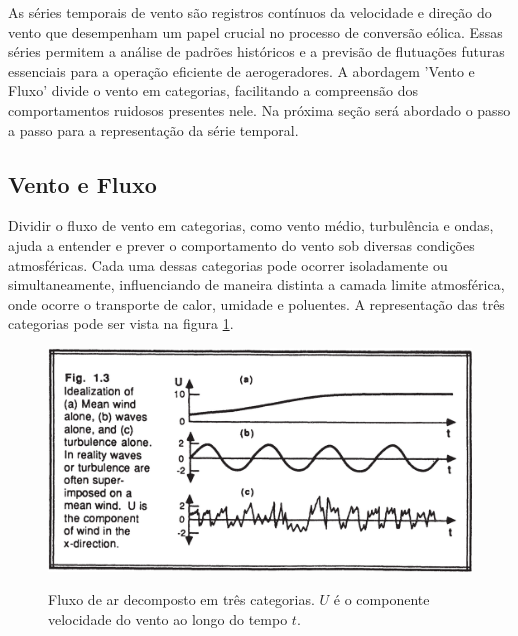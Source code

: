 \par As séries temporais de vento são registros contínuos da velocidade e direção do vento que desempenham um papel crucial no processo de conversão eólica. Essas séries permitem a análise de padrões históricos e a previsão de flutuações futuras essenciais para a operação eficiente de aerogeradores. A abordagem 'Vento e Fluxo' divide o vento em categorias, facilitando a compreensão dos comportamentos ruidosos presentes nele. Na próxima seção será abordado o passo a passo para a representação da série temporal.

\subsection{Vento e Fluxo}

\par Dividir o fluxo de vento em categorias, como vento médio, turbulência e ondas, ajuda a entender e prever o comportamento do vento sob diversas condições atmosféricas. Cada uma dessas categorias pode ocorrer isoladamente ou simultaneamente, influenciando de maneira distinta a camada limite atmosférica, onde ocorre o transporte de calor, umidade e poluentes. A representação das três categorias pode ser vista na figura \ref{fig:fluxo_ar}. 

\begin{figure}[h]
    \centering
    \caption{Fluxo de ar decomposto em três categorias. \(U\) é o componente velocidade do vento ao longo do tempo \(t\).}
    \includegraphics[width=\textwidth]{Figuras/Teorico/vento_sub3_fonte.png}
    \label{fig:fluxo_ar}
\end{figure}


